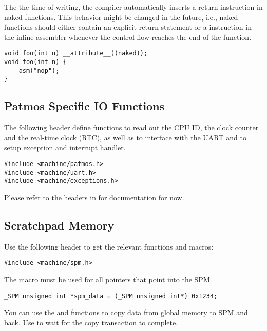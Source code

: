The the time of writing, the compiler automatically inserts a return instruction in naked functions. This behavior might be changed
in the future, i.e., naked functions should either contain an explicit return statement or a  instruction in
the inline assembler whenever the control flow reaches the end of the function.

\begin{verbatim}
void foo(int n) __attribute__((naked));
void foo(int n) {
    asm("nop");
}
\end{verbatim}


\subsection{Patmos Specific IO Functions}

The following header define functions to read out the CPU ID, the clock counter and the real-time clock (RTC), as well as to
interface with the UART and to setup exception and interrupt handler.

\begin{verbatim}
#include <machine/patmos.h>
#include <machine/uart.h>
#include <machine/exceptions.h>
\end{verbatim}

Please refer to the headers in  for documentation for now.


\subsection{Scratchpad Memory}

Use the following header to get the relevant functions and macros:

\begin{verbatim}
#include <machine/spm.h>
\end{verbatim}

The  macro must be used for all pointers that point into the SPM.

\begin{verbatim}
_SPM unsigned int *spm_data = (_SPM unsigned int*) 0x1234;
\end{verbatim}

You can use the  and  functions
to copy data from global memory to SPM and back. Use  to
wait for the copy transaction to complete.




